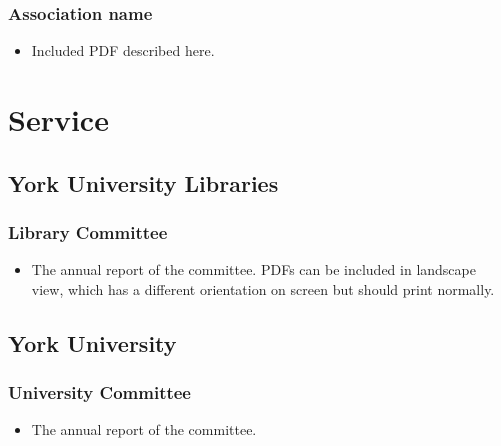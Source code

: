 \documentclass[12pt,oneside]{book}
\begin{document}
\subsection{Association name}

\begin{itemize}
  \item Included PDF described here.
\end{itemize}




\renewcommand\thechapter{C}
\chapter{Service}

\section{York University Libraries}

\subsection{Library Committee}

\begin{itemize}
  \item The annual report of the committee.  PDFs can be included in landscape view, which has a different orientation on screen but should print normally.
\end{itemize}



\section{York University}

\subsection{University Committee}

\begin{itemize}
  \item The annual report of the committee.
\end{itemize}




\end{document}
